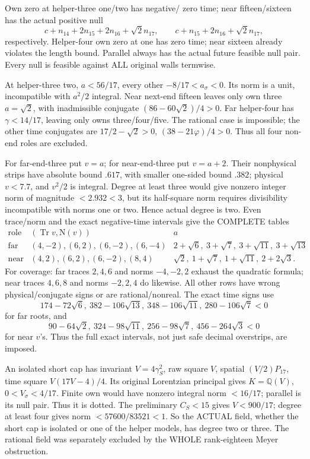 Own zero at helper-three one/two has negative/
zero time; near fifteen/sixteen has the actual
positive null
\[
 c+n_{14}+2n_{15}+2n_{16}+\sqrt2n_{17},\qquad
 c+n_{15}+2n_{16}+\sqrt2n_{17},
\]
respectively.
Helper-four own zero at one has zero time;
near sixteen already violates the length bound.
Parallel always has the actual future feasible
null pair.
Every null is feasible against ALL original
walls termwise.

At helper-three two,
\(a<56/17\), every other \(-8/17<a_\sigma<0\).
Its norm is a unit, incompatible with
\(a^2/2\) integral.
Near next-end fifteen leaves only own three
\(a=\sqrt2\), with inadmissible conjugate
\((86-60\sqrt2)/4>0\).
Far helper-four has \(\gamma<14/17\), leaving
only owns three/four/five.
The rational case is impossible;
the other time conjugates are
\(17/2-\sqrt2>0\), \((38-21\varphi)/4>0\).
Thus all four non-end roles are excluded.

For far-end-three put \(v=a\); for near-end-three
put \(v=a+2\).
Their nonphysical strips have absolute bound
\(.617\), with smaller one-sided bound \(.382\);
physical \(v<7.7\), and \(v^2/2\) is integral.
Degree at least three would give nonzero integer
norm of magnitude \(<2.932<3\), but its
half-square norm requires divisibility incompatible
with norms one or two.
Hence actual degree is two.
Even trace/norm and the exact negative-time
intervals give the COMPLETE tables
\[
\begin{array}{c|c|c}
 \text{role}&(\operatorname{Tr}v,\mathrm N(v))&a\\ \hline
 \text{far}&(4,-2),(6,2),(6,-2),(6,-4)&
       2+\sqrt6,\ 3+\sqrt7,\ 3+\sqrt{11},\ 3+\sqrt{13}\\
 \text{near}&(4,2),(6,2),(6,-2),(8,4)&
       \sqrt2,\ 1+\sqrt7,\ 1+\sqrt{11},\ 2+2\sqrt3 .
\end{array}
\]
For coverage: far traces \(2,4,6\) and norms
\(-4,-2,2\) exhaust the quadratic formula;
near traces \(4,6,8\) and norms \(-2,2,4\)
do likewise.
All other rows have wrong physical/conjugate
signs or are rational/nonreal.
The exact time signs use
\[
174-72\sqrt6,\ 382-106\sqrt{13},\
348-106\sqrt{11},\ 280-106\sqrt7<0
\]
for far roots, and
\[
90-64\sqrt2,\ 324-98\sqrt{11},\
256-98\sqrt7,\ 456-264\sqrt3<0
\]
for near \(v\)'s.
Thus the full exact intervals, not just safe
decimal overstrips, are imposed.

An isolated short cap has invariant
\(V=4\gamma_S^2\), raw square \(V\), spatial
\((V/2)P_{17}\), time square \(V(17V-4)/4\).
Its original Lorentzian principal gives
\(K=\mathbb Q(V)\), \(0<V_\sigma<4/17\).
Finite own would have nonzero integral norm
\(<16/17\); parallel is its null pair.
Thus it is dotted.
The preliminary \(C_S<15\) gives \(V<900/17\);
degree at least four gives norm
\(<57600/83521<1\).
So the ACTUAL field, whether the short cap is
isolated or one of the helper models, has
degree two or three.
The rational field was separately excluded by
the WHOLE rank-eighteen Meyer obstruction.

